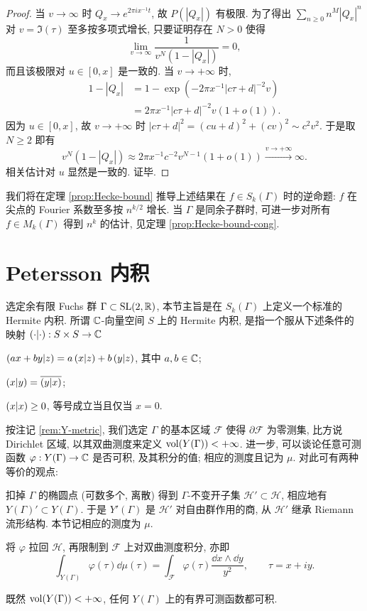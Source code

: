 \begin{proof}
	当 $v \to \infty$ 时 $Q_x \to e^{2\pi ix^{-1} t}$, 故 $P(|Q_x|)$ 有极限. 为了得出 $\sum_{n \geq 0} n^M |Q_x|^n$ 对 $v = \Im(\tau)$ 至多按多项式增长, 只要证明存在 $N > 0$ 使得
	\[ \lim_{v \to \infty} \dfrac{1}{v^N \left( 1 - |Q_x| \right) } = 0, \]
	而且该极限对 $u \in [0, x]$ 是一致的. 当 $v \to +\infty$ 时,
	\begin{align*}
		1 - |Q_x| & =  1 - \exp\left( -2\pi x^{-1} |c\tau + d|^{-2} v \right) \\
		& = 2\pi x^{-1} |c\tau + d|^{-2} v \left( 1 + o(1) \right).
	\end{align*}
	因为 $u \in [0,x]$, 故 $v \to +\infty$ 时 $|c\tau + d|^2 = (cu+d)^2 + (cv)^2 \sim c^2 v^2$. 于是取 $N \geq 2$ 即有
	\[ v^N \left( 1 - |Q_x| \right) \approx 2\pi x^{-1}c^{-2} v^{N-1} (1 + o(1)) \xrightarrow{v \to +\infty} \infty. \]
	相关估计对 $u$ 显然是一致的. 证毕.
\end{proof}

我们将在定理 \ref{prop:Hecke-bound} 推导上述结果在 $f \in S_k(\Gamma)$ 时的逆命题: $f$ 在尖点的 Fourier 系数至多按 $n^{k/2}$ 增长. 当 $\Gamma$ 是同余子群时, 可进一步对所有 $f \in M_k(\Gamma)$ 得到 $n^k$ 的估计, 见定理 \ref{prop:Hecke-bound-cong}.

\section{Petersson 内积}\label{sec:Petersson}
选定余有限 Fuchs 群 $\Gamma \subset \operatorname{SL}(2,\mathbb{R})$, 本节主旨是在 $S_k(\Gamma)$ 上定义一个标准的 Hermite 内积. 所谓 $\mathbb{C}$-向量空间 $S$ 上的 Hermite 内积, 是指一个服从下述条件的映射 $\left( \cdot \middle| \cdot \right): S \times S \to \mathbb{C}$
\begin{compactitem}
	\item $\left( ax+by \middle| z \right) = a\left( x \middle| z \right) + b\left( y \middle| z \right)$, 其中 $a,b \in \mathbb{C}$;
	\item $\left( x \middle| y \right) = \overline{\left( y \middle| x \right)}$;
	\item $\left( x \middle| x \right) \geq 0$, 等号成立当且仅当 $x=0$.
\end{compactitem}

按注记 \ref{rem:Y-metric}, 我们选定 $\Gamma$ 的基本区域 $\mathcal{F}$ 使得 $\partial \mathcal{F}$ 为零测集, 比方说 Dirichlet 区域, 以其双曲测度来定义 $\operatorname{vol}(Y(\Gamma)) < +\infty$. 进一步, 可以谈论任意可测函数 $\varphi: Y(\Gamma) \to \mathbb{C}$ 是否可积, 及其积分的值; 相应的测度且记为 $\mu$. 对此可有两种等价的观点:
\begin{compactitem}
	\item 扣掉 $\Gamma$ 的椭圆点 (可数多个, 离散) 得到 $\Gamma$-不变开子集 $\mathcal{H}' \subset \mathcal{H}$, 相应地有 $Y(\Gamma)' \subset Y(\Gamma)$. 于是 $Y'(\Gamma)$ 是 $\mathcal{H}'$ 对自由群作用的商, 从 $\mathcal{H}'$ 继承 Riemann 流形结构. 本节记相应的测度为 $\mu$.
	\item 将 $\varphi$ 拉回 $\mathcal{H}$, 再限制到 $\mathcal{F}$ 上对双曲测度积分, 亦即
	\[ \int_{Y(\Gamma)} \varphi(\tau) \dd\mu(\tau) = \int_{\mathcal{F}} \varphi(\tau) \dfrac{\dd x \wedge \dd y}{y^2}, \qquad \tau = x + iy. \]
\end{compactitem}
既然 $\operatorname{vol}(Y(\Gamma)) < +\infty$, 任何 $Y(\Gamma)$ 上的有界可测函数都可积.

